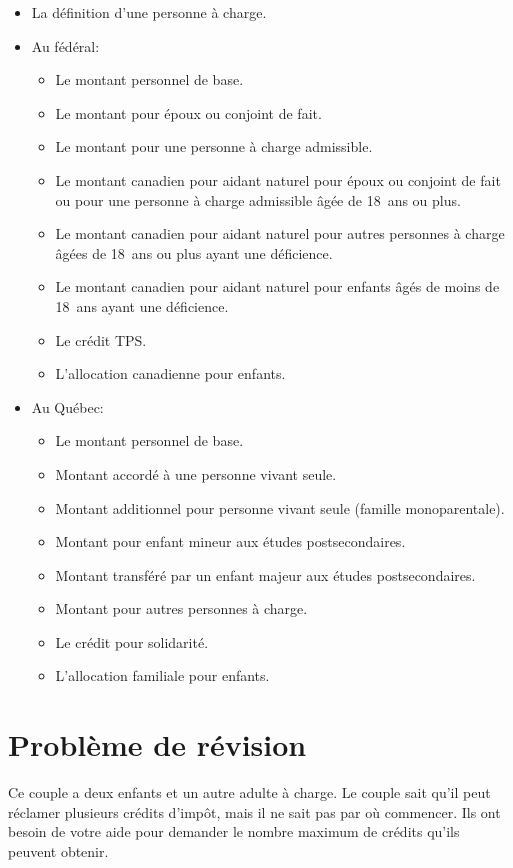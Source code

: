 \begin{itemize}
	\item La définition d'une personne à charge.
	\item Au fédéral:
	\begin{itemize}
		\item Le montant personnel de base.
		\item Le montant pour époux ou conjoint de fait.
		\item Le montant pour une personne à charge admissible.
		\item Le montant canadien pour aidant naturel pour époux ou conjoint de fait ou pour une personne à charge admissible âgée de 18~ans ou plus.
		\item Le montant canadien pour aidant naturel pour autres personnes à charge âgées de 18~ans ou plus ayant une déficience.
		\item Le montant canadien pour aidant naturel pour enfants âgés de moins de 18~ans ayant une déficience.
		\item Le crédit TPS.
		\item L'allocation canadienne pour enfants.
	\end{itemize}
	\item Au Québec:
	\begin{itemize}
		\item Le montant personnel de base.
		\item Montant accordé à une personne vivant seule.
		\item Montant additionnel pour personne vivant seule (famille monoparentale).
		\item Montant pour enfant mineur aux études postsecondaires.
		\item Montant transféré par un enfant majeur aux études postsecondaires.
		\item Montant pour autres personnes à charge.
		\item Le crédit pour solidarité.
		\item L'allocation familiale pour enfants.
	\end{itemize}
\end{itemize}



\section{Problème de révision}
Ce couple a deux enfants et un autre adulte à charge. Le couple sait qu'il peut réclamer plusieurs crédits d'impôt, mais il ne sait pas par où commencer. Ils ont besoin de votre aide pour demander le nombre maximum de crédits qu'ils peuvent obtenir.


